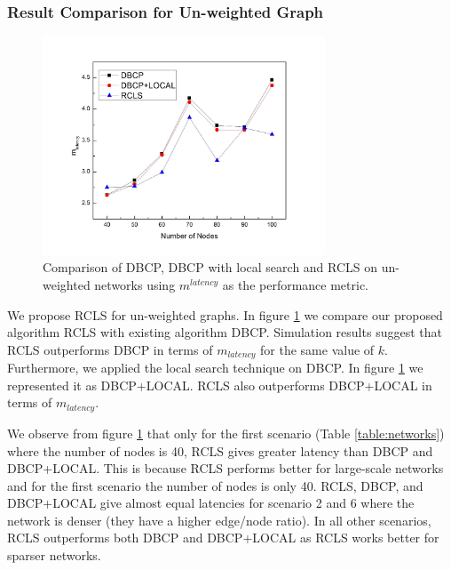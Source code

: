 \documentclass[times]{dacauth}
\begin{document}
\subsubsection{Result Comparison for Un-weighted Graph}
\begin{figure}
	\centering
	\includegraphics[width=0.75\textwidth]{Figures/ugraph.jpg}
	\caption{Comparison of DBCP, DBCP with local search and RCLS on un-weighted networks using $m^{latency}$ as the performance metric.}
	\label{fig:ugraph}
\end{figure}
We propose RCLS for un-weighted graphs. In figure \ref{fig:ugraph} we compare our proposed algorithm RCLS with existing algorithm DBCP. Simulation results suggest that RCLS outperforms DBCP in terms of $m_{latency}$ for the same value of $k$. Furthermore, we applied the local search technique on DBCP. In figure \ref{fig:ugraph} we represented it as DBCP+LOCAL. RCLS also outperforms DBCP+LOCAL in terms of $m_{latency}$.

We observe from figure \ref{fig:ugraph} that only for the first scenario (Table \ref{table:networks}) where the number of nodes is 40, RCLS gives greater latency than DBCP and DBCP+LOCAL. This is because RCLS performs better for large-scale networks and for the first scenario the number of nodes is only 40. RCLS, DBCP, and DBCP+LOCAL give almost equal latencies for scenario 2 and 6 where the network is denser (they have a higher edge/node ratio). In all other scenarios, RCLS outperforms both DBCP and DBCP+LOCAL as RCLS works better for sparser networks.
\end{document}

